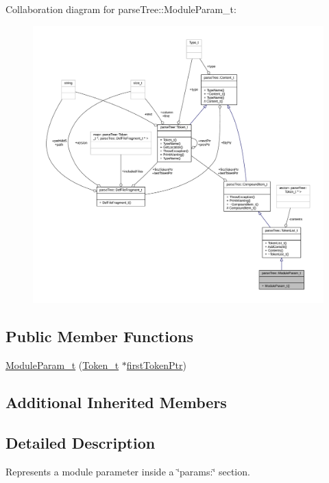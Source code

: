 Collaboration diagram for parse\+Tree\+:\+:Module\+Param\+\_\+t\+:
\nopagebreak
\begin{figure}[H]
\begin{center}
\leavevmode
\includegraphics[width=350pt]{structparse_tree_1_1_module_param__t__coll__graph}
\end{center}
\end{figure}
\subsection*{Public Member Functions}
\begin{DoxyCompactItemize}
\item 
\hyperlink{structparse_tree_1_1_module_param__t_af4056cd7aefa0aac205cbf947c662e4f}{Module\+Param\+\_\+t} (\hyperlink{structparse_tree_1_1_token__t}{Token\+\_\+t} $\ast$\hyperlink{structparse_tree_1_1_compound_item__t_a587020c943e760cb0152dd8cd31e21ef}{first\+Token\+Ptr})
\end{DoxyCompactItemize}
\subsection*{Additional Inherited Members}


\subsection{Detailed Description}
Represents a module parameter inside a \char`\"{}params\+:\char`\"{} section. 

